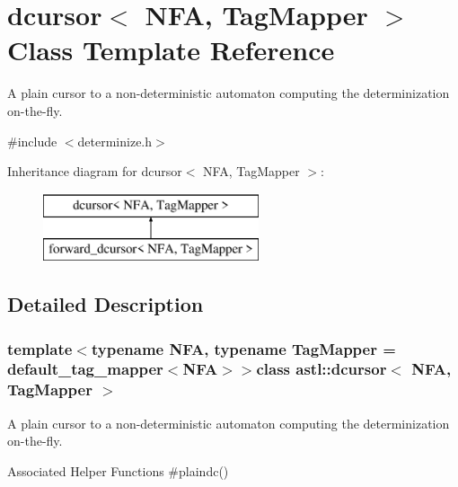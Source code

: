 \section{dcursor$<$ N\+F\+A, Tag\+Mapper $>$ Class Template Reference}
\label{classastl_1_1dcursor}


A plain cursor to a non-\/deterministic automaton computing the determinization on-\/the-\/fly.  




{\ttfamily \#include $<$determinize.\+h$>$}

Inheritance diagram for dcursor$<$ N\+F\+A, Tag\+Mapper $>$\+:\begin{figure}[H]
\begin{center}
\leavevmode
\includegraphics[height=2.000000cm]{classastl_1_1dcursor}
\end{center}
\end{figure}


\subsection{Detailed Description}
\subsubsection*{template$<$typename N\+F\+A, typename Tag\+Mapper = default\+\_\+tag\+\_\+mapper$<$\+N\+F\+A$>$$>$class astl\+::dcursor$<$ N\+F\+A, Tag\+Mapper $>$}

A plain cursor to a non-\/deterministic automaton computing the determinization on-\/the-\/fly. 

\begin{DoxyParagraph}{Associated Helper Functions}
\#plaindc() 
\end{DoxyParagraph}
